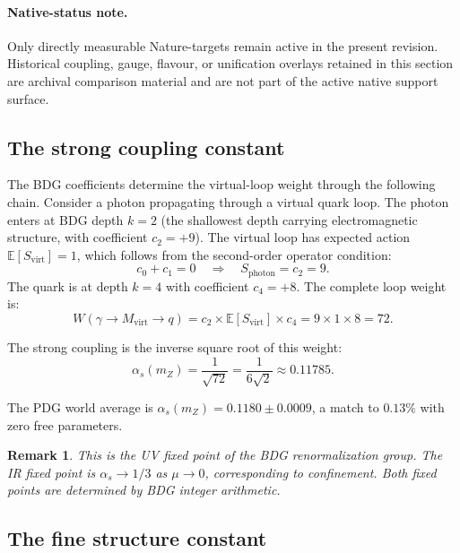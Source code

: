 \documentclass[11pt]{article}
\newtheorem{remark}{Remark}
\begin{document}
\paragraph{Native-status note.} Only directly measurable Nature-targets remain active in the present revision. Historical coupling, gauge, flavour, or unification overlays retained in this section are archival comparison material and are not part of the active native support surface.
\label{sec:couplings}

\subsection{The strong coupling constant}
\label{sec:alpha_s}

The BDG coefficients determine the virtual-loop weight through the following chain. Consider a photon propagating through a virtual quark loop. The photon enters at BDG depth $k=2$ (the shallowest depth carrying electromagnetic structure, with coefficient $c_2=+9$). The virtual loop has expected action $\mathbb{E}[S_{\mathrm{virt}}]=1$, which follows from the second-order operator condition:
\begin{equation}
c_0+c_1=0 \quad\Longrightarrow\quad S_{\mathrm{photon}}=c_2=9.
\end{equation}
The quark is at depth $k=4$ with coefficient $c_4=+8$. The complete loop weight is:
\begin{equation}
W(\gamma\to M_{\mathrm{virt}}\to q) = c_2\times\mathbb{E}[S_{\mathrm{virt}}]\times c_4 = 9\times 1\times 8 = 72.
\end{equation}

The strong coupling is the inverse square root of this weight:
\begin{equation}
\boxed{\alpha_s(m_Z) = \frac{1}{\sqrt{72}} = \frac{1}{6\sqrt{2}} \approx 0.11785.}
\end{equation}

The PDG world average is $\alpha_s(m_Z)=0.1180\pm 0.0009$, a match to $0.13\%$ with zero free parameters.

\begin{remark}
This is the UV fixed point of the BDG renormalization group. The IR fixed point is $\alpha_s\to 1/3$ as $\mu\to 0$, corresponding to confinement. Both fixed points are determined by BDG integer arithmetic.
\end{remark}

\subsection{The fine structure constant}
\label{sec:alpha_em}
\end{document}
